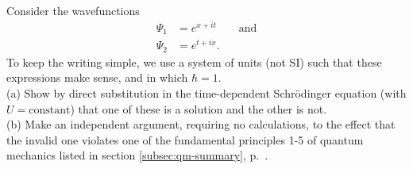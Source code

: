 Consider the wavefunctions
\begin{align*}
  \Psi_1 &= e^{x+it} \qquad \text{and} \\
  \Psi_2 &= e^{t+ix}.
\end{align*}
To keep the writing simple, we use a system of units (not SI) such that these expressions make
sense, and in which $\hbar=1$.\\
(a) Show by direct substitution in the time-dependent Schr\"odinger equation (with $U=\text{constant}$)
that one of these
is a solution and the other is not.\\
(b) Make an independent argument, requiring no calculations, to the effect that the invalid
one violates one of the fundamental principles 1-5 of quantum mechanics listed in section
\ref{subsec:qm-summary}, p.~\pageref{subsec:qm-summary}.
